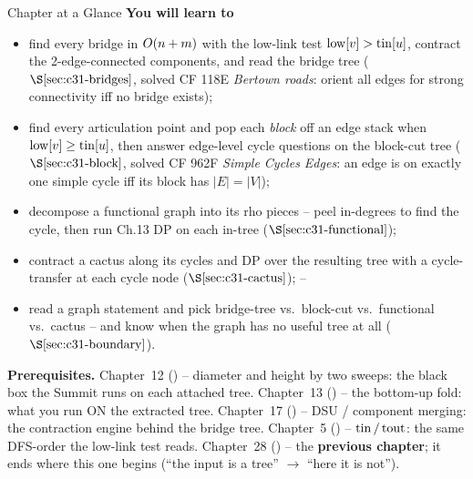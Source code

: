 \begin{chaptertheorybox}{Chapter at a Glance}
\textbf{You will learn to}
\begin{itemize}[nosep]
  \item find every bridge in \(O(n+m)\) with the low-link test
        \(\mathrm{low}[v]>\operatorname{tin}[u]\), contract the 2-edge-connected components, and
        read the bridge tree (\(\secref{c31-bridges}\), solved CF 118E \emph{Bertown
        roads}: orient all edges for strong connectivity iff no bridge exists); \hfill{}
  \item find every articulation point and pop each \emph{block} off an edge stack
        when \(\mathrm{low}[v]\ge\operatorname{tin}[u]\), then answer edge-level cycle questions
        on the block-cut tree (\(\secref{c31-block}\), solved CF 962F \emph{Simple
        Cycles Edges}: an edge is on exactly one simple cycle iff its block has
        \(|E|=|V|\)); \hfill{}
  \item decompose a functional graph into its rho pieces -- peel in-degrees to
        find the cycle, then run Ch.13 DP on each in-tree (\(\secref{c31-functional}\)); \hfill{}
  \item contract a cactus along its cycles and DP over the resulting tree with a
        cycle-transfer at each cycle node (\(\secref{c31-cactus}\)); \hfill{}--
  \item read a graph statement and pick bridge-tree vs.\ block-cut vs.\ functional
        vs.\ cactus -- and know when the graph has no useful tree at all
        (\(\secref{c31-boundary}\)). \hfill{}
\end{itemize}

\textbf{Prerequisites.} Chapter~12 () -- diameter and height by two
sweeps: the black box the Summit runs on each attached tree.  Chapter~13
() -- the bottom-up fold: what you run ON the extracted tree.
Chapter~17 () -- DSU / component merging: the contraction engine
behind the bridge tree.  Chapter~5 () -- \(\operatorname{tin}/\operatorname{tout}\): the same
DFS-order the low-link test reads.  Chapter~28 () -- the
\textbf{previous chapter}; it ends where this one begins (``the input is a
tree'' \(\to\) ``here it is not'').
\end{chaptertheorybox}

